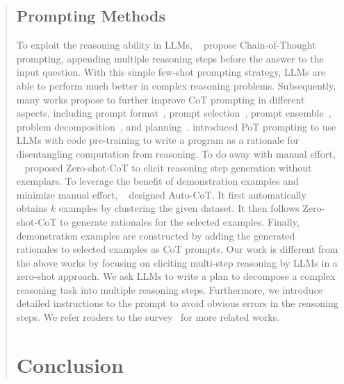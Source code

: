 \documentclass[11pt]{article}
\begin{document}
\begin{abstract}
\subsection{Prompting Methods}
To exploit the reasoning ability in LLMs, ~\citet{cot_wei} propose Chain-of-Thought prompting, appending multiple reasoning steps before the answer to the input question. 
With this simple few-shot prompting strategy, LLMs are able to perform much better in complex reasoning problems.
Subsequently, many works
\citep{wang2022towards, suzgun2022challenging, shaikh2022second_ana, saparov2022language_ana} propose to further improve CoT prompting in different aspects, including prompt format~\cite{chen2022program}, prompt selection~\citep{lu2022dynamic}, prompt ensemble~\cite{wang2022self_consistency, li2022advance, self_verification, fu2022complexity}, problem decomposition~\cite{zhou2022least_to_most, khot2022decomposed, dua2022successive, press2022measuring}, 
and planning~\cite{Yao2022ReActSR, huang2022language, wang2023describe, liu2023llm+, Sun2023PEARLPL, Yao2023TreeOT}.
\citet{chen2022program} introduced PoT prompting to use LLMs with code pre-training to write a program as a rationale for disentangling computation from reasoning.
To do away with manual effort, ~\citet{kojima2022large} proposed Zero-shot-CoT to elicit reasoning step generation without exemplars.  %
To leverage the benefit of demonstration examples and minimize manual effort, ~\citet{zhang2022automatic} designed Auto-CoT. It first automatically obtains $k$ examples by clustering the given dataset. It then follows Zero-shot-CoT to generate rationales for the selected examples. Finally, demonstration examples are constructed by adding the generated rationales to selected examples as CoT prompts. 
Our work is different from the above works by focusing on eliciting multi-step reasoning by  LLMs in a zero-shot approach. We ask LLMs to write a plan to decompose a complex reasoning task into multiple reasoning steps. Furthermore, we introduce detailed instructions to the prompt to avoid obvious errors in the reasoning steps.
We refer readers to the survey~\cite{ huang2022towards_survey} for more related works.

\section{Conclusion}


\end{abstract}
\end{document}

